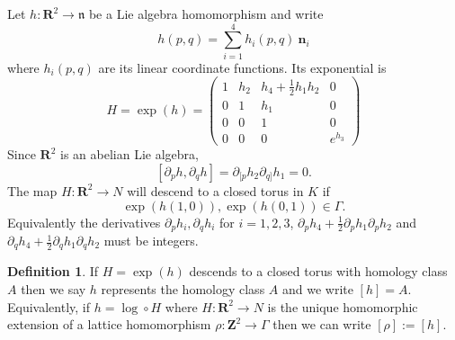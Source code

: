 \documentclass[11pt]{amsart}
\newcommand{\RR}{\mathbf{R}}
\newcommand{\ZZ}{\mathbf{Z}}
\newcommand{\nn}{\mathfrak{n}}
\numberwithin{equation}{section}
\theoremstyle{definition}
\newtheorem{dfn}[equation]{Definition}
\theoremstyle{remark}
\begin{document}
Let $h\colon\RR^2\to\nn$ be a Lie algebra homomorphism and write
\[h(p,q)=\sum_{i=1}^4h_i(p,q)\ \mathbf{n}_i\]
where $h_i(p,q)$ are its linear coordinate functions. Its exponential is
\begin{equation}\label{expcurv}H=\exp(h)=\left(\begin{array}{ccccccc}
1 & h_2 & h_4+\frac{1}{2}h_1h_2 & 0 \\
0 & 1 & h_1 & 0 \\
0 & 0 & 1 & 0 \\
0 & 0 & 0 & e^{h_3}
\end{array}\right)
\end{equation}
Since $\RR^2$ is an abelian Lie algebra,
\begin{equation}\label{abelian}[\partial_ph,\partial_qh]=\partial_{[p}h_2\partial_{q]}h_1=0.\end{equation}
The map $H\colon\RR^2\to N$ will descend to a closed torus in $K$ if
\[\exp(h(1,0)),\exp(h(0,1))\in\Gamma.\]
Equivalently the derivatives $\partial_ph_i,\partial_qh_i$ for $i=1,2,3$, $\partial_ph_4+\frac{1}{2}\partial_ph_1\partial_ph_2$ and $\partial_qh_4+\frac{1}{2}\partial_qh_1\partial_qh_2$ must be integers.

\begin{dfn}
If $H=\exp(h)$ descends to a closed torus with homology class $A$ then we say $h$ represents the homology class $A$ and we write $[h]=A$. Equivalently, if $h=\log\circ H$ where $H\colon\RR^2\to N$ is the unique homomorphic extension of a lattice homomorphism $\rho\colon\ZZ^2\to\Gamma$ then we can write $[\rho]:=[h]$.
\end{dfn}
\end{document}
